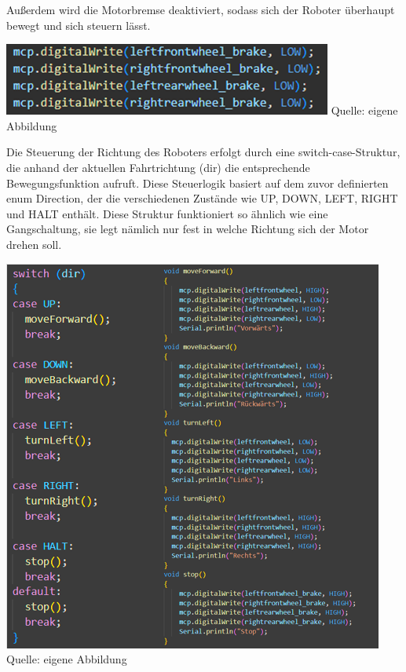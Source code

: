\documentclass[ngerman,12pt,a4paper]{article}
\begin{document}
	Außerdem wird die Motorbremse deaktiviert, sodass sich der Roboter überhaupt bewegt und sich steuern lässt. \\[0.5cm]
	\begin{minipage}{\textwidth}
		\centering
		\includegraphics[scale=1.2]{Pictures/code_motorbremse_motoren}
		\label{fig:code_motorbremse_motoren}
		\vspace{-2pt}
		\small Quelle: eigene Abbildung
		\vspace{10pt}
	\end{minipage}
	Die Steuerung der Richtung des Roboters erfolgt durch eine switch-case-Struktur, die anhand der aktuellen Fahrtrichtung (dir) die entsprechende Bewegungsfunktion aufruft. Diese Steuerlogik basiert auf dem zuvor definierten enum Direction, der die verschiedenen Zustände wie UP, DOWN, LEFT, RIGHT und HALT enthält. Diese Struktur funktioniert so ähnlich wie eine Gangschaltung, sie legt nämlich nur fest in welche Richtung sich der Motor drehen soll. \\[0.5cm]
	\begin{minipage}{\textwidth}
		\centering
		\includegraphics[scale=1.2]{Pictures/code_switch_case_motoren}
		\label{fig:code_switch_case_motoren}
		\vspace{-2pt}
		\small Quelle: eigene Abbildung
		\vspace{10pt}
	\end{minipage}
\end{document}
